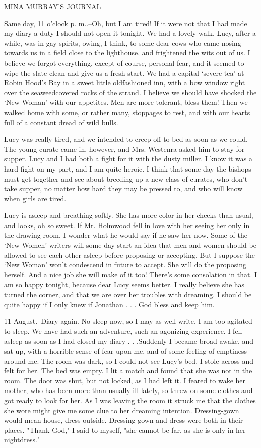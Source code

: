 MINA MURRAY'S JOURNAL 

Same day, 11 o'clock p. m..--Oh, but I am tired! If it were not that I had made my diary a duty I should not open it tonight. We had a lovely walk. Lucy, after a while, was in gay spirits, owing, I think, to some dear cows who came nosing towards us in a field close to the lighthouse, and frightened the wits out of us. I believe we forgot everything, except of course, personal fear, and it seemed to wipe the slate clean and give us a fresh start. We had a capital `severe tea' at Robin Hood's Bay in a sweet little oldfashioned inn, with a bow window right over the seaweedcovered rocks of the strand. I believe we should have shocked the `New Woman' with our appetites. Men are more tolerant, bless them! Then we walked home with some, or rather many, stoppages to rest, and with our hearts full of a constant dread of wild bulls. 

Lucy was really tired, and we intended to creep off to bed as soon as we could. The young curate came in, however, and Mrs. Westenra asked him to stay for supper. Lucy and I had both a fight for it with the dusty miller. I know it was a hard fight on my part, and I am quite heroic. I think that some day the bishops must get together and see about breeding up a new class of curates, who don't take supper, no matter how hard they may be pressed to, and who will know when girls are tired. 

Lucy is asleep and breathing softly. She has more color in her cheeks than usual, and looks, oh so sweet. If Mr. Holmwood fell in love with her seeing her only in the drawing room, I wonder what he would say if he saw her now. Some of the `New Women' writers will some day start an idea that men and women should be allowed to see each other asleep before proposing or accepting. But I suppose the `New Woman' won't condescend in future to accept. She will do the proposing herself. And a nice job she will make of it too! There's some consolation in that. I am so happy tonight, because dear Lucy seems better. I really believe she has turned the corner, and that we are over her troubles with dreaming. I should be quite happy if I only knew if Jonathan . . . God bless and keep him. 

11 August.--Diary again. No sleep now, so I may as well write. I am too agitated to sleep. We have had such an adventure, such an agonizing experience. I fell asleep as soon as I had closed my diary . . .Suddenly I became broad awake, and sat up, with a horrible sense of fear upon me, and of some feeling of emptiness around me. The room was dark, so I could not see Lucy's bed. I stole across and felt for her. The bed was empty. I lit a match and found that she was not in the room. The door was shut, but not locked, as I had left it. I feared to wake her mother, who has been more than usually ill lately, so threw on some clothes and got ready to look for her. As I was leaving the room it struck me that the clothes she wore might give me some clue to her dreaming intention. Dressing-gown would mean house, dress outside. Dressing-gown and dress were both in their places. "Thank God," I said to myself, "she cannot be far, as she is only in her nightdress." 

